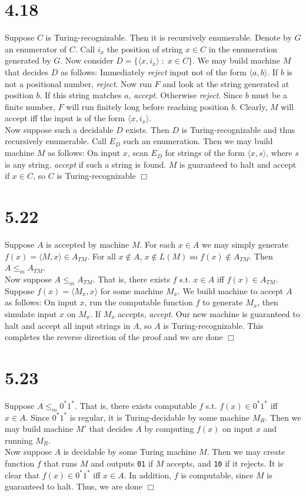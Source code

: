 \documentclass{article}
\begin{document}
\section*{4.18}
Suppose $C$ is Turing-recognizable. Then it is recursively enumerable. Denote by $G$ an enumerator of $C$. Call $i_x$ the position of string $x \in C$ in the enumeration generated by $G$. Now consider $D = \{\langle x, i_x \rangle \;:\; x \in C\}$. We may build machine $M$ that decides $D$ as follows: Immediately \textit{reject} input not of the form $\langle a,b \rangle$. If $b$ is not a positional number, \textit{reject}. Now run $F$ and look at the string generated at position $b$. If this string matches $a$, \textit{accept}. Otherwise \textit{reject}. Since $b$ must be a finite number, $F$ will run finitely long before reaching position $b$. Clearly, $M$ will accept iff the input is of the form $\langle x, i_x \rangle$.\\
Now suppose such a decidable $D$ exists. Then $D$ is Turing-recognizable and thus recursively enumerable. Call $E_D$ such an enumeration. Then we may build machine $M$ as follows: On input $x$, scan $E_D$ for strings of the form $\langle x, s \rangle$, where $s$ is any string. \textit{accept} if such a string is found. $M$ is guaranteed to halt and accept if $x \in C$, so $C$ is Turing-recognizable $\Box$

\section*{5.22}
Suppose $A$ is accepted by machine $M$. For each $x \in A$ we may simply generate $f(x) = \langle M,x \rangle \in A_{TM}$. For all $x \notin A$, $x \notin L(M)$ so $f(x) \notin A_{TM}$. Then $A \leqslant_m A_{TM}$.\\
Now suppose $A \leqslant_m A_{TM}$. That is, there exists $f$ s.t. $x \in A$ iff $f(x) \in A_{TM}$. Suppose $f(x) = \langle M_x,x \rangle$ for some machine $M_x$. We build machine to accept $A$ as follows: On input $x$, run the computable function $f$ to generate $M_x$, then simulate input $x$ on $M_x$. If $M_x$ accepts, \textit{accept}. Our new machine is guaranteed to halt and accept all input strings in $A$, so $A$ is Turing-recognizable. This completes the reverse direction of the proof and we are done $\Box$

\section*{5.23}
Suppose $A \leqslant_m 0^*1^*$. That is, there exists computable $f$ s.t. $f(x) \in 0^*1^*$ iff $x \in A$. Since $0^*1^*$ is regular, it is Turing-decidable by some machine $M_R$. Then we may build machine $M'$ that decides $A$ by computing $f(x)$ on input $x$ and running $M_R$.\\
Now suppose $A$ is decidable by some Turing machine $M$. Then we may create function $f$ that runs $M$ and outputs \verb|01| if $M$ accepts, and \verb|10| if it rejects. It is clear that $f(x) \in 0^*1^*$ iff $x \in A$. In addition, $f$ is computable, since $M$ is guaranteed to halt. Thus, we are done $\Box$
\end{document}
